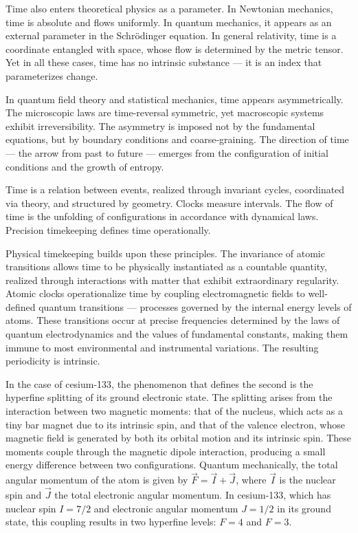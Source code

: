Time also enters theoretical physics as a parameter. In Newtonian mechanics, time is absolute and flows uniformly. In quantum mechanics, it appears as an external parameter in the Schrödinger equation. In general relativity, time is a coordinate entangled with space, whose flow is determined by the metric tensor. Yet in all these cases, time has no intrinsic substance — it is an index that parameterizes change.

In quantum field theory and statistical mechanics, time appears asymmetrically. The microscopic laws are time-reversal symmetric, yet macroscopic systems exhibit irreversibility. The asymmetry is imposed not by the fundamental equations, but by boundary conditions and coarse-graining. The direction of time — the arrow from past to future — emerges from the configuration of initial conditions and the growth of entropy.

Time is a relation between events, realized through invariant cycles, coordinated via theory, and structured by geometry. Clocks measure intervals. The flow of time is the unfolding of configurations in accordance with dynamical laws. Precision timekeeping defines time operationally.

Physical timekeeping builds upon these principles. The invariance of atomic transitions allows time to be physically instantiated as a countable quantity, realized through interactions with matter that exhibit extraordinary regularity. Atomic clocks operationalize time by coupling electromagnetic fields to well-defined quantum transitions — processes governed by the internal energy levels of atoms. These transitions occur at precise frequencies determined by the laws of quantum electrodynamics and the values of fundamental constants, making them immune to most environmental and instrumental variations. The resulting periodicity is intrinsic.

In the case of cesium-133, the phenomenon that defines the second is the hyperfine splitting of its ground electronic state. The splitting arises from the interaction between two magnetic moments: that of the nucleus, which acts as a tiny bar magnet due to its intrinsic spin, and that of the valence electron, whose magnetic field is generated by both its orbital motion and its intrinsic spin. These moments couple through the magnetic dipole interaction, producing a small energy difference between two configurations. Quantum mechanically, the total angular momentum of the atom is given by $\vec{F} = \vec{I} + \vec{J}$, where $\vec{I}$ is the nuclear spin and $\vec{J}$ the total electronic angular momentum. In cesium-133, which has nuclear spin $I = 7/2$ and electronic angular momentum $J = 1/2$ in its ground state, this coupling results in two hyperfine levels: $F = 4$ and $F = 3$.

